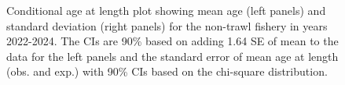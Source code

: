 \documentclass[
]{scrartcl}
\begin{document}
\begin{figure}[H]


\caption{\label{fig-call-plot-nt3}Conditional age at length plot showing
mean age (left panels) and standard deviation (right panels) for the
non-trawl fishery in years 2022-2024. The CIs are 90\% based on adding
1.64 SE of mean to the data for the left panels and the standard error
of mean age at length (obs. and exp.) with 90\% CIs based on the
chi-square distribution.}

\end{figure}%
\end{document}
